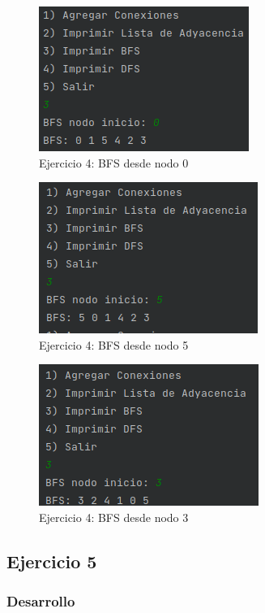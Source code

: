 \documentclass{article}
\begin{document}
			\begin{figure}[H]
				\centering
				\includegraphics[scale= 1]{images/e48.png}
				\caption*{Ejercicio 4: BFS desde nodo 0}
			\end{figure}
			
			\begin{figure}[H]
				\centering
				\includegraphics[scale= 1]{images/e49.png}
				\caption*{Ejercicio 4: BFS desde nodo 5}
			\end{figure}
			
			\begin{figure}[H]
				\centering
				\includegraphics[scale= 1]{images/e410.png}
				\caption*{Ejercicio 4: BFS desde nodo 3}
			\end{figure}
		
		\newpage
			
		\subsection{Ejercicio 5}
			\subsubsection{Desarrollo}
			
\end{document}
